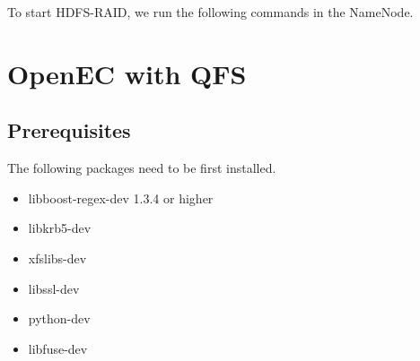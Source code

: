 \documentclass[letterpaper,12pt]{article}
\begin{document}
To start HDFS-RAID, we run the following commands in the NameNode.

\begin{center}
\noindent{}
\end{center}

\section{OpenEC with QFS}
\label{sec:qfs}

\subsection{Prerequisites}

The following packages need to be first installed.

\begin{itemize}

\item libboost-regex-dev 1.3.4 or higher

\begin{center}
\noindent{}
\end{center}

\item libkrb5-dev

\begin{center}
\noindent{}
\end{center}

\item xfslibs-dev

\begin{center}
\noindent{}
\end{center}

\item libssl-dev

\begin{center}
\noindent{}
\end{center}

\item python-dev

\begin{center}
\noindent{}
\end{center}

\item libfuse-dev

\begin{center}
\noindent{}
\end{center}

\end{itemize}
\end{document}
